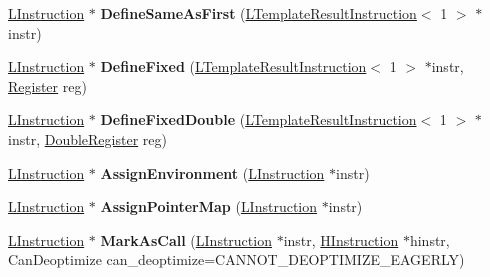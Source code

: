 \begin{DoxyCompactItemize}
\item 
\hyperlink{classv8_1_1internal_1_1_l_instruction}{L\+Instruction} $\ast$ {\bfseries Define\+Same\+As\+First} (\hyperlink{classv8_1_1internal_1_1_l_template_result_instruction}{L\+Template\+Result\+Instruction}$<$ 1 $>$ $\ast$instr)\hypertarget{classv8_1_1internal_1_1_l_chunk_builder_a7a3e6bb64466e8d0b7062311bc13455a}{}\label{classv8_1_1internal_1_1_l_chunk_builder_a7a3e6bb64466e8d0b7062311bc13455a}

\item 
\hyperlink{classv8_1_1internal_1_1_l_instruction}{L\+Instruction} $\ast$ {\bfseries Define\+Fixed} (\hyperlink{classv8_1_1internal_1_1_l_template_result_instruction}{L\+Template\+Result\+Instruction}$<$ 1 $>$ $\ast$instr, \hyperlink{structv8_1_1internal_1_1_register}{Register} reg)\hypertarget{classv8_1_1internal_1_1_l_chunk_builder_a7dfb72b4e8c8ed4fc4acb6c8ce207af9}{}\label{classv8_1_1internal_1_1_l_chunk_builder_a7dfb72b4e8c8ed4fc4acb6c8ce207af9}

\item 
\hyperlink{classv8_1_1internal_1_1_l_instruction}{L\+Instruction} $\ast$ {\bfseries Define\+Fixed\+Double} (\hyperlink{classv8_1_1internal_1_1_l_template_result_instruction}{L\+Template\+Result\+Instruction}$<$ 1 $>$ $\ast$instr, \hyperlink{structv8_1_1internal_1_1_double_register}{Double\+Register} reg)\hypertarget{classv8_1_1internal_1_1_l_chunk_builder_aa9504301e737cc0e32d8dabaa2583e90}{}\label{classv8_1_1internal_1_1_l_chunk_builder_aa9504301e737cc0e32d8dabaa2583e90}

\item 
\hyperlink{classv8_1_1internal_1_1_l_instruction}{L\+Instruction} $\ast$ {\bfseries Assign\+Environment} (\hyperlink{classv8_1_1internal_1_1_l_instruction}{L\+Instruction} $\ast$instr)\hypertarget{classv8_1_1internal_1_1_l_chunk_builder_a57688ea94214122c105fd9dcb458067c}{}\label{classv8_1_1internal_1_1_l_chunk_builder_a57688ea94214122c105fd9dcb458067c}

\item 
\hyperlink{classv8_1_1internal_1_1_l_instruction}{L\+Instruction} $\ast$ {\bfseries Assign\+Pointer\+Map} (\hyperlink{classv8_1_1internal_1_1_l_instruction}{L\+Instruction} $\ast$instr)\hypertarget{classv8_1_1internal_1_1_l_chunk_builder_a310b14c9a7f420e8294d1180c8ea030b}{}\label{classv8_1_1internal_1_1_l_chunk_builder_a310b14c9a7f420e8294d1180c8ea030b}

\item 
\hyperlink{classv8_1_1internal_1_1_l_instruction}{L\+Instruction} $\ast$ {\bfseries Mark\+As\+Call} (\hyperlink{classv8_1_1internal_1_1_l_instruction}{L\+Instruction} $\ast$instr, \hyperlink{classv8_1_1internal_1_1_h_instruction}{H\+Instruction} $\ast$hinstr, Can\+Deoptimize can\+\_\+deoptimize=C\+A\+N\+N\+O\+T\+\_\+\+D\+E\+O\+P\+T\+I\+M\+I\+Z\+E\+\_\+\+E\+A\+G\+E\+R\+LY)\hypertarget{classv8_1_1internal_1_1_l_chunk_builder_af7d51aa993ccf0b54ae1599f1bc027d1}{}\label{classv8_1_1internal_1_1_l_chunk_builder_af7d51aa993ccf0b54ae1599f1bc027d1}


\end{DoxyCompactItemize}
